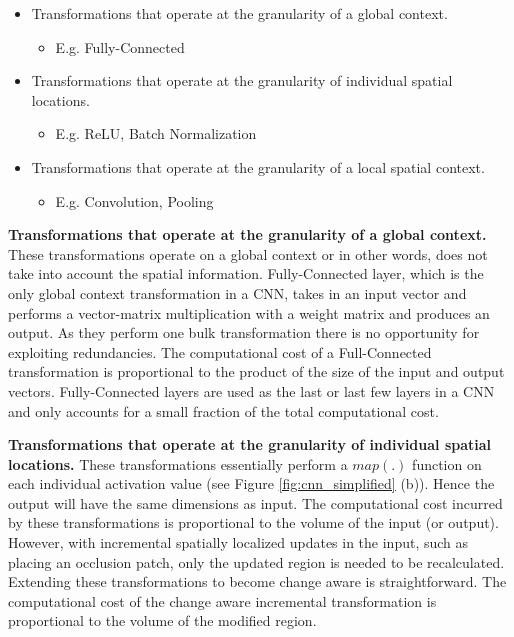 \begin{itemize}
    \item Transformations that operate at the granularity of a global context.
    \begin{itemize}
     \item E.g. Fully-Connected
    \end{itemize}
	\item Transformations that operate at the granularity of individual  spatial locations.
	\begin{itemize}
	 \item E.g. ReLU, Batch Normalization
	\end{itemize}
	\item Transformations that operate at the granularity of a local spatial context.
	\begin{itemize}
	 \item E.g. Convolution, Pooling
	\end{itemize}
\end{itemize}

\vspace{2mm}
\noindent \textbf{Transformations that operate at the granularity of a global context.} These transformations operate on a global context or in other words, does not take into account the spatial information.
Fully-Connected layer, which is the only global context transformation in a CNN, takes in an input vector and performs a vector-matrix multiplication with a weight matrix and produces an output.
As they perform one bulk transformation there is no opportunity for exploiting redundancies.
The computational cost of a Full-Connected transformation is proportional to the product of the size of the input and output vectors.
Fully-Connected layers are used as the last or last few layers in a CNN and only accounts for a small fraction of the total computational cost.

\vspace{2mm}
\noindent \textbf{Transformations that operate at the granularity of individual  spatial locations.} These transformations essentially perform a $map(.)$ function on each individual activation value (see Figure \ref{fig:cnn_simplified} (b)).
Hence the output will have the same dimensions as input.
The computational cost incurred by these transformations is proportional to the volume of the input (or output).
However, with incremental spatially localized updates in the input, such as placing an occlusion patch, only the updated region is needed to be recalculated.
Extending these transformations to become change aware is straightforward.
The computational cost of the change aware incremental transformation is proportional to the volume of the modified region.


